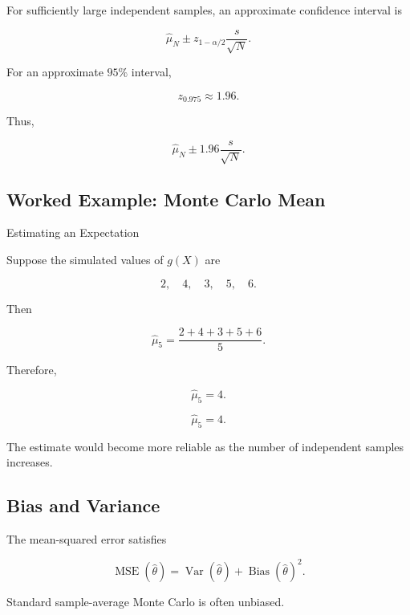 For sufficiently large independent samples, an approximate confidence
interval is

\[
\boxed{
\widehat{\mu}_N
\pm
z_{1-\alpha/2}
\frac{s}{\sqrt{N}}.
}
\]

For an approximate \(95\%\) interval,

\[
z_{0.975}
\approx1.96.
\]

Thus,

\[
\boxed{
\widehat{\mu}_N
\pm
1.96
\frac{s}{\sqrt{N}}.
}
\]

\subsection{Worked Example: Monte Carlo Mean}
\label{subsec:worked-mc-mean}

\begin{workedexamplebox}{Estimating an Expectation}

Suppose the simulated values of \(g(X)\) are

\[
2,\quad4,\quad3,\quad5,\quad6.
\]

Then

\[
\widehat{\mu}_5
=
\frac{
2+4+3+5+6
}{
5
}.
\]

Therefore,

\[
\widehat{\mu}_5
=
4.
\]

\begin{answerbox}
\[
\boxed{
\widehat{\mu}_5=4.
}
\]
\end{answerbox}

The estimate would become more reliable as the number of independent
samples increases.

\end{workedexamplebox}

\subsection{Bias and Variance}
\label{subsec:mc-bias-variance}

The mean-squared error satisfies

\[
\boxed{
\operatorname{MSE}
(
\widehat{\theta}
)
=
\operatorname{Var}
(
\widehat{\theta}
)
+
\operatorname{Bias}
(
\widehat{\theta}
)^2.
}
\]

Standard sample-average Monte Carlo is often unbiased.

